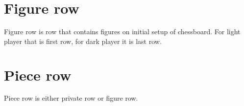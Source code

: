 \section*{Figure row}
\label{sec:Terms/Figure row}
Figure row is row that contains figures on initial setup of chessboard.
For light player that is first row, for dark player it is last row.

\section*{Piece row}
\label{sec:Terms/Piece row}
Piece row is either private row or figure row.

\clearpage %
